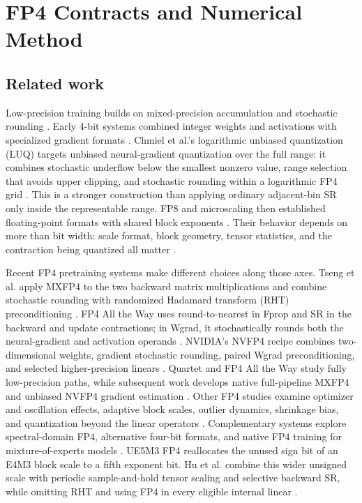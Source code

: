 \section{FP4 Contracts and Numerical Method}

\subsection{Related work}

Low-precision training builds on mixed-precision accumulation and stochastic
rounding \cite{gupta2015limited,micikevicius2018mixedprecision}. Early 4-bit
systems combined integer weights and activations with specialized gradient
formats \cite{sun2020ultralow}. Chmiel et al.'s logarithmic unbiased
quantization (LUQ) targets unbiased neural-gradient quantization over the full
range: it combines stochastic underflow below the smallest nonzero value,
range selection that avoids upper clipping, and stochastic rounding within a
logarithmic FP4 grid \cite{chmiel2023accurate}. This is a stronger construction
than applying ordinary adjacent-bin SR only inside the representable range.
FP8 and microscaling then established floating-point formats with shared block exponents
\cite{micikevicius2022fp8,rouhani2023microexponents,
rouhani2023microscaling,ocp2023mx}. Their behavior depends on more than bit
width: scale format, block geometry, tensor statistics, and the contraction
being quantized all matter
\cite{yang2025microscaling,hu2025designspace,sun2025scaling,fasoli2026finer}.

Recent FP4 pretraining systems make different choices along those axes. Tseng
et al. apply MXFP4 to the two backward matrix multiplications and combine
stochastic rounding with randomized Hadamard transform (RHT) preconditioning
\cite{tseng2025mxfp4}. FP4 All the Way uses round-to-nearest in Fprop and SR in
the backward and update contractions; in Wgrad, it stochastically rounds both
the neural-gradient and activation operands \cite{chmiel2025fp4alltheway}.
NVIDIA's NVFP4 recipe combines two-dimensional weights, gradient stochastic
rounding, paired Wgrad preconditioning, and selected higher-precision linears
\cite{nvidia2025nvfp4}. Quartet and FP4 All the Way study fully low-precision
paths, while subsequent work develops native
full-pipeline MXFP4 and unbiased NVFP4 gradient estimation
\cite{castro2025quartet,chmiel2025fp4alltheway,cim2026nativemxfp4,
panferov2026quartetii}.
Other FP4 studies examine optimizer and oscillation effects, adaptive block
scales, outlier dynamics, shrinkage bias, and quantization beyond the linear
operators
\cite{wang2025fp4,zhou2025exploringfp4,chen2025tetrajet,
chen2025tetrajetv2,cook2025fouroversix,dong2026outliers,
zhao2026ufp4,ding2026fullstack,agrusa2026whatmatters}. Complementary systems
explore spectral-domain FP4, alternative four-bit formats, and native FP4
training for mixture-of-experts models
\cite{cao2026metis,taghian2026hifloat4,du2026halfs,zhang2026hoppermoe}.
UE5M3 FP4 reallocates the unused sign bit of an E4M3 block scale to a fifth
exponent bit. Hu et al. combine this wider unsigned scale with periodic
sample-and-hold tensor scaling and selective backward SR, while omitting RHT
and using FP4 in every eligible internal linear
\cite{hu2026ue5m3}.

